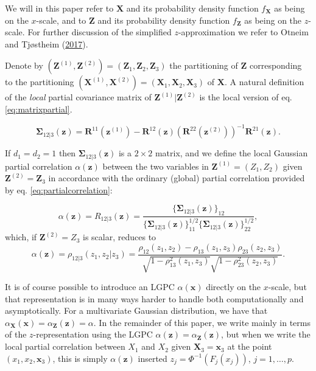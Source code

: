 \documentclass[
  12pt,
  letterpaper]{article}
\newcommand{\X}{\bm{X}}
\newcommand{\Xone}{\bm{X}^{(1)}}
\newcommand{\Xtwo}{\bm{X}^{(2)}}
\newcommand{\x}{\bm{x}}
\newcommand{\Z}{\bm{Z}}
\newcommand{\z}{\bm{z}}
\newcommand{\Zone}{\bm{Z}^{(1)}}
\newcommand{\Ztwo}{\bm{Z}^{(2)}}
\newcommand{\zone}{\bm{z}^{(1)}}
\newcommand{\ztwo}{\bm{z}^{(2)}}
\newcommand{\R}{\bm{R}}
\newcommand{\fSigma}{\bm{\Sigma}}
\theoremstyle{definition}
\theoremstyle{definition}
\theoremstyle{definition}
\theoremstyle{remark}
\begin{document}
We will in this paper refer to \(\X\) and its probability density function \(f_{\X}\) as being on the \(x\)-scale, and to \(\Z\) and its probability density function \(f_{\Z}\) as being on the \(z\)-scale. For further discussion of the simplified \(z\)-approximation we refer to Otneim and Tjøstheim (\protect\hyperlink{ref-otneim2017locally}{2017}).

Denote by \((\Zone, \Ztwo) = (\Z_1, \Z_2, \Z_3)\) the partitioning of \(\Z\) corresponding to the partitioning \((\Xone, \Xtwo) = (\X_1, \X_2, \X_3)\) of \(\X\). A natural definition of the \emph{local} partial covariance matrix of \(\Zone|\Ztwo\) is the local version of eq. \eqref{eq:matrixpartial}.

\begin{equation}
\fSigma_{12|3}(\z) = \R^{11}(\zone) - \R^{12}(\z)\left(\R^{22}(\ztwo)\right)^{-1}\R^{21}(\z).
\label{eq:matrixlocalpartial}
\end{equation}

If \(d_1=d_2=1\) then \(\fSigma_{12|3}(\z)\) is a \(2\times 2\) matrix, and we define the local Gaussian partial correlation \(\alpha(\z)\) between the two variables in \(\Zone = (Z_1,Z_2)\) given \(\Ztwo = \Z_3\) in accordance with the ordinary (global) partial correlation provided by eq. \eqref{eq:partialcorrelation}:

\begin{equation}
\alpha(\z) = R_{12|3}(\z) = \frac{\Big\{\fSigma_{12|3}(\z)\Big\}_{12}}{\Big\{\fSigma_{12|3}(\z)\Big\}^{1/2}_{11}\Big\{\fSigma_{12|3}(\z)\Big\}^{1/2}_{22}},
\label{eq:definition}
\end{equation}
which, if \(\Ztwo = Z_3\) is scalar, reduces to
\begin{equation}
\alpha(\z) = \rho_{12|3}(z_1, z_2|z_3) = \frac{\rho_{12}(z_1, z_2) - \rho_{13}(z_1,z_3)\rho_{23}(z_2,z_3)}{\sqrt{1 - \rho^2_{13}(z_1,z_3)}\sqrt{1 - \rho^2_{23}(z_2, z_3)}}.
\label{eq:scalardefinition}
\end{equation}

It is of course possible to introduce an LGPC \(\alpha(\x)\) directly on the \(x\)-scale, but that representation is in many ways harder to handle both computationally and asymptotically. For a multivariate Gaussian distribution, we have that \(\alpha_{\X}(\x) = \alpha_{\Z}(\z) = \alpha\). In the remainder of this paper, we write mainly in terms of the \(z\)-representation using the LGPC \(\alpha(\z) = \alpha_{\Z}(\z)\), but when we write the local partial correlation between \(X_1\) and \(X_2\) given \(\X_3 = \x_3\) at the point \((x_1,x_2,\x_3)\), this is simply \(\alpha(\z)\) inserted \(z_j = \Phi^{-1}(F_{j}(x_j))\), \(j=1,\ldots,p\).
\end{document}
